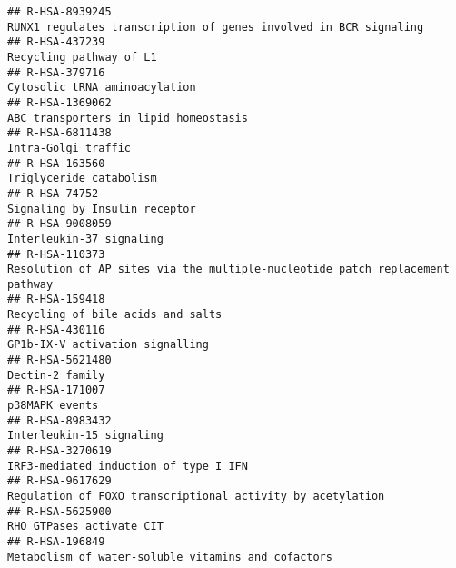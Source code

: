 \documentclass[
]{article}
\begin{document}
\begin{verbatim}
## R-HSA-8939245                                                                     RUNX1 regulates transcription of genes involved in BCR signaling
## R-HSA-437239                                                                                                               Recycling pathway of L1
## R-HSA-379716                                                                                                         Cytosolic tRNA aminoacylation
## R-HSA-1369062                                                                                                ABC transporters in lipid homeostasis
## R-HSA-6811438                                                                                                                  Intra-Golgi traffic
## R-HSA-163560                                                                                                               Triglyceride catabolism
## R-HSA-74752                                                                                                          Signaling by Insulin receptor
## R-HSA-9008059                                                                                                             Interleukin-37 signaling
## R-HSA-110373                                                          Resolution of AP sites via the multiple-nucleotide patch replacement pathway
## R-HSA-159418                                                                                                     Recycling of bile acids and salts
## R-HSA-430116                                                                                                       GP1b-IX-V activation signalling
## R-HSA-5621480                                                                                                                      Dectin-2 family
## R-HSA-171007                                                                                                                        p38MAPK events
## R-HSA-8983432                                                                                                             Interleukin-15 signaling
## R-HSA-3270619                                                                                                IRF3-mediated induction of type I IFN
## R-HSA-9617629                                                                           Regulation of FOXO transcriptional activity by acetylation
## R-HSA-5625900                                                                                                             RHO GTPases activate CIT
## R-HSA-196849                                                                                    Metabolism of water-soluble vitamins and cofactors

\end{verbatim}
\end{document}
